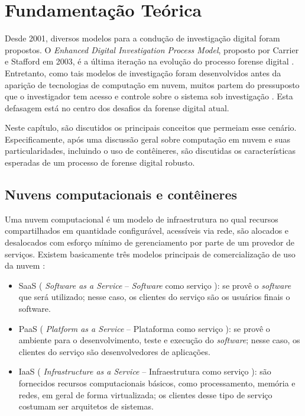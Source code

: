 \chapter{Fundamentação Teórica}
\label{chp:fundamentação}


Desde 2001, diversos modelos para a condução de investigação digital foram propostos. 
%
O \textit{Enhanced Digital Investigation Process Model}, proposto por Carrier e Stafford em 2003, é a última iteração na evolução do processo forense digital \cite{GrisposChallengesCloudComputing:2012}. 
%
Entretanto, como tais modelos de investigação foram desenvolvidos antes da aparição de tecnologias de computação em nuvem, muitos partem do pressuposto que o investigador tem acesso e controle sobre o sistema sob investigação \cite{GrisposChallengesCloudComputing:2012}.
%
Esta defasagem está no centro dos desafios da forense digital atual.


Neste capítulo, são discutidos os principais conceitos que permeiam esse cenário.
%
Especificamente, após uma discussão geral sobre computação em nuvem e suas particularidades, incluindo o uso de contêineres, são discutidas os características esperadas de um processo de forense digital robusto.


\section{Nuvens computacionais e contêineres}
\label{sec:computacaonuvem}

Uma nuvem computacional é um modelo de infraestrutura no qual recursos compartilhados em quantidade configurável, acessíveis via rede, são alocados e desalocados com esforço mínimo de gerenciamento por parte de um provedor de serviços.
%
Existem basicamente três modelos principais de comercialização de uso da nuvem \cite{NIST2011}: 

\begin{itemize}
	\item SaaS ( \textit{Software as a Service} -- \textit{Software} como serviço ): se provê o \textit{software} que será utilizado; nesse caso, os clientes do serviço são os usuários finais o software.
	
	\item PaaS ( \textit{Platform as a Service} -- Plataforma como serviço ): se provê o ambiente para o desenvolvimento, teste e execução do \textit{software}; nesse caso, os clientes do serviço são desenvolvedores de aplicações.
	
	\item IaaS ( \textit{Infrastructure as a Service} -- Infraestrutura como serviço ): são fornecidos recursos computacionais básicos, como processamento, memória e redes, em geral de forma virtualizada; os clientes desse tipo de serviço costumam ser arquitetos de sistemas.
\end{itemize}

